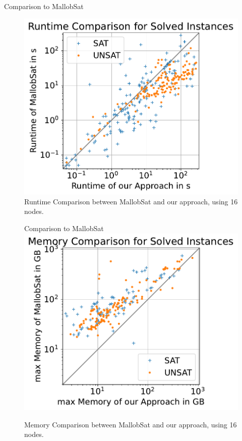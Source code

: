 \documentclass{beamer}
\begin{document}
\begin{frame}{Comparison to MallobSat}
    \center
    \begin{figure}[c]{}
      \center
      \includegraphics[scale=.45]{plots/square_runtime_compare/square_runtime_16node.pdf}
      \caption{Runtime Comparison between MallobSat and our approach, using 16 nodes.}
    \end{figure}
\end{frame}

\begin{frame}{}
    \center
    \begin{figure}[c]{Comparison to MallobSat}
        \center
        \includegraphics[scale=.45]{plots/square_mem_compare/square_mem_16node.pdf}
        \caption{Memory Comparison between MallobSat and our approach, using 16 nodes.}
    \end{figure}
\end{frame}
\end{document}

